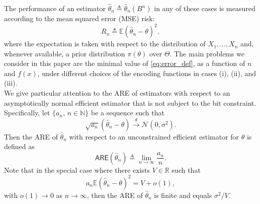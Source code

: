 \documentclass[letterpaper, 11pt]{IEEEtran}      %
\newcommand{\ARE}{\mathsf{ARE}}
\newcommand{\Ncal}{\mathcal{N}}
\begin{document}
The performance of an estimator $\hat{\theta}_n \triangleq \hat{\theta}_n(B^n)$ in any of these cases is measured according to the mean squared error (MSE) risk:
\begin{equation}
\label{eq:error_def}
R_n \triangleq \mathbb E\left(\hat{\theta}_n - \theta \right)^2,
\end{equation}
where the expectation is taken with respect to the distribution of $X_1,\ldots,X_n$ and, whenever available, a prior distribution $\pi(\theta)$ over $\Theta$.  
%
The main problems we consider in this paper are the minimal value of \eqref{eq:error_def}, as a function of $n$ and $f(x)$, under different choices of the encoding functions in cases (i), (ii), and (iii). \\

We give particular attention to the ARE of estimators with respect to an asymptotically normal efficient estimator that is not subject to the bit constraint. Specifically, let $\{a_n,\,n\in \mathbb N\}$ be a sequence such that 
\[
\sqrt{a_n}\left(\hat{\theta}_n - \theta\right) \overset{d}{\longrightarrow} \Ncal(0, \sigma^2).
\]
Then the ARE of $\hat{\theta}_n$ with respect to an unconstrained efficient estimator for $\theta$ is defined as \cite[Def. 6.6.6]{lehmann2006theory}
\[
\ARE(\hat{\theta}_n) \triangleq
\lim_{n\rightarrow \infty} \frac{a_n}{n}. 
\]
Note that in the special case where there exists $V \in \mathbb R$ such that
\[
a_n \mathbb E \left(\hat{\theta}_n - \theta \right)^2 = V + o(1),
\]
with $o(1)\to 0$ as $n\to \infty$, then the ARE of $\hat{\theta}_n$ is finite and equals $\sigma^2/V$. \\
\end{document}
